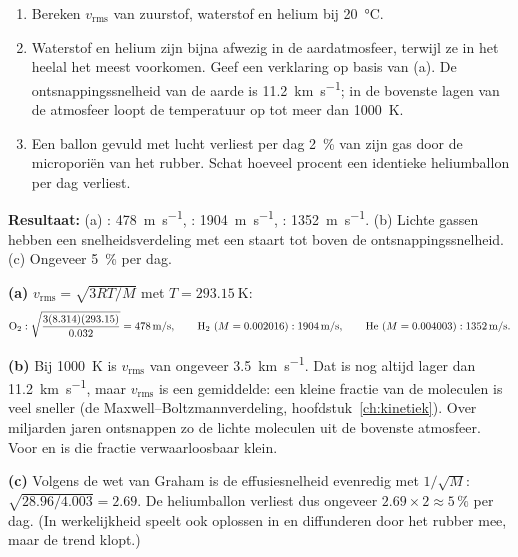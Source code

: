 \begin{oefening}
\begin{enumerate}
\item[(a)] Bereken $v_\mathrm{rms}$ van zuurstof, waterstof en helium bij \SI{20}{\celsius}.
\item[(b)] Waterstof en helium zijn bijna afwezig in de aardatmosfeer, terwijl ze in het heelal het meest voorkomen. Geef een verklaring op basis van (a). De ontsnappingssnelheid van de aarde is \SI{11.2}{\kilo\metre\per\second}; in de bovenste lagen van de atmosfeer loopt de temperatuur op tot meer dan \SI{1000}{\kelvin}.
\item[(c)] Een ballon gevuld met lucht verliest per dag \SI{2}{\percent} van zijn gas door de microporiën van het rubber. Schat hoeveel procent een identieke heliumballon per dag verliest.
\end{enumerate}
\end{oefening}
\begin{oplossing}
\textbf{Resultaat:} (a) : \SI{478}{\metre\per\second}, : \SI{1904}{\metre\per\second}, : \SI{1352}{\metre\per\second}. (b) Lichte gassen hebben een snelheidsverdeling met een staart tot boven de ontsnappingssnelheid. (c) Ongeveer \SI{5}{\percent} per dag.

\textbf{(a)} $v_\mathrm{rms} = \sqrt{3RT/M}$ met $T = \SI{293.15}{\kelvin}$:
\[
\ce{O2}: \sqrt{\frac{3(8.314)(293.15)}{0.032}} = 478\,\mathrm{m/s},\qquad
\ce{H2}\ (M = 0.002016): 1904\,\mathrm{m/s},\qquad
\ce{He}\ (M = 0.004003): 1352\,\mathrm{m/s}.
\]

\textbf{(b)} Bij \SI{1000}{\kelvin} is $v_\mathrm{rms}$ van  ongeveer \SI{3.5}{\kilo\metre\per\second}. Dat is nog altijd lager dan \SI{11.2}{\kilo\metre\per\second}, maar $v_\mathrm{rms}$ is een gemiddelde: een kleine fractie van de moleculen is veel sneller (de Maxwell--Boltzmannverdeling, hoofdstuk~\ref{ch:kinetiek}). Over miljarden jaren ontsnappen zo de lichte moleculen uit de bovenste atmosfeer. Voor  en  is die fractie verwaarloosbaar klein.

\textbf{(c)} Volgens de wet van Graham is de effusiesnelheid evenredig met $1/\sqrt{M}$: $\sqrt{28.96/4.003} = 2.69$. De heliumballon verliest dus ongeveer $2.69 \times 2 \approx 5\,\%$ per dag. (In werkelijkheid speelt ook oplossen in en diffunderen door het rubber mee, maar de trend klopt.)
\end{oplossing}

